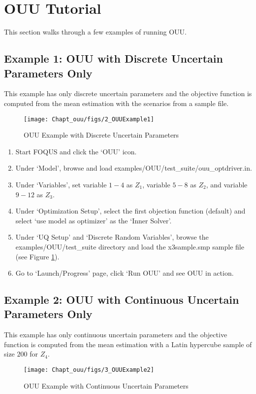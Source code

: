 \section{OUU Tutorial}
\label{sec:ouu_tutorial}

This section walks through a few examples of running OUU. 

\subsection{Example 1: OUU with Discrete Uncertain Parameters Only}

This example has only discrete uncertain parameters and the objective
function is computed from the mean estimation with the scenarios
from a sample file. 
\begin{figure}[H]
\centering \texttt{[image: Chapt\_ouu/figs/2\_OUUExample1]}
\caption{OUU Example with Discrete Uncertain Parameters}
\label{fig:ouu_ex1}
\end{figure}

\begin{enumerate}
\item Start FOQUS and click the `OUU' icon.
\item Under `Model', browse and load {\sf examples/OUU/test\_suite/ouu\_optdriver.in}.
\item Under `Variables', set variable $1-4$ as $Z_1$, variable $5-8$ as $Z_2$, and
      variable $9-12$ as $Z_3$.
\item Under `Optimization Setup', select the first objection function (default)
      and select `use model as optimizer' as the `Inner Solver'.
\item Under `UQ Setup' and `Discrete Random Variables', browse the  
      {\sf examples/OUU/test\_suite} directory and load the
      {\sf x3sample.smp} sample file (see Figure \ref{fig:ouu_ex1}).
\item Go to `Launch/Progress' page, click `Run OUU' and see OUU in action.
\end{enumerate}

\subsection{Example 2: OUU with Continuous Uncertain Parameters Only}

This example has only continuous uncertain parameters and the objective
function is computed from the mean estimation with a Latin hypercube
sample of size $200$ for $Z_4$.
\begin{figure}[H]
\centering \texttt{[image: Chapt\_ouu/figs/3\_OUUExample2]}
\caption{OUU Example with Continuous Uncertain Parameters}
\label{fig:ouu_ex2}
\end{figure}

